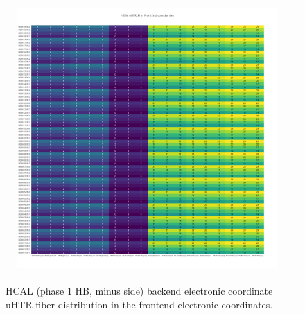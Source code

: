 \clearpage
\begin{figure}[htb]
 \begin{center}
  \begin{tabular}{cc}
   \includegraphics[angle=0,width=0.95\textwidth]{figures/appendix/HBM_uHTR_FI_in_FrontEnd.png}
  \end{tabular}
  \caption{HCAL (phase 1 HB, minus side) backend electronic coordinate uHTR fiber distribution in the frontend electronic coordinates.}
  \label{fig:lmapHBMuHTRFIFEC}
 \end{center}
\end{figure}

